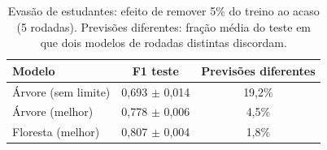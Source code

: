 \begin{table}[!t]
\centering
\caption{Evasão de estudantes: efeito de remover 5\% do treino ao acaso (5 rodadas). Previsões diferentes: fração média do teste em que dois modelos de rodadas distintas discordam.}
\label{tab:estudantes_estab}
\begin{tabular}{lcc}
\hline
Modelo & F1 teste & Previsões diferentes \\
\hline
Árvore (sem limite) & 0,693 $\pm$ 0,014 & 19,2\% \\
Árvore (melhor) & 0,778 $\pm$ 0,006 & 4,5\% \\
Floresta (melhor) & 0,807 $\pm$ 0,004 & 1,8\% \\
\hline
\end{tabular}
\end{table}